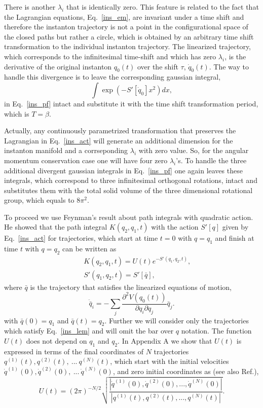 \documentclass[journal=jpcafh,manuscript=article]{achemso}
\begin{document}
There is another $\lambda_i$ that is identically zero. This feature is
related to the fact that the Lagrangian equations, Eq.~\ref{ins_em},
are invariant under a time shift and therefore the instanton
trajectory is not a point in the configurational space of the closed
paths but rather a circle, which is obtained by an arbitrary time
shift transformation to the individual instanton trajectory. The
linearized trajectory, which corresponds to the infinitesimal
time-shift and which has zero $\lambda_i$, is the derivative of the
original instanton $q_0(t)$ over the shift $\tau$, $\dot{q}_0(t)$. The
way to handle this divergence is to leave the corresponding gaussian
integral,
\begin{equation}
  \label{zero_int}
\int\exp(-S'[\dot{q}_0]x^2)dx,
\end{equation}
in Eq.~\ref{ins_pf} intact and substitute it with the time shift
transformation period, which is $T=\beta$.

Actually, any continuously parametrized transformation that preserves
the Lagrangian in Eq.~\ref{ins_act} will generate an additional
dimension for the instanton manifold and a corrseponding $\lambda_i$
with zero value. So, for the angular momentum conservation case one
will have four zero $\lambda_i$'s.  To handle the three additional
divergent gaussian integrals in Eq.~\ref{ins_pf} one again leaves
these integrals, which correspond to three infinitesimal orthogonal
rotations, intact and substitutes them with the total solid volume of
the three dimensional rotational group, which equals to $8\pi^2$.

To proceed we use Feynman's result about path integrals with
quadratic action\cite{feynman72}. He showed that the path integral
$K(q_2,q_1,t)$
with the action $S'[q]$ given by  Eq.~\ref{ins_act} for trajectories,
which start at time
$t=0$ with $q=q_1$ and finish at time $t$ with $q=q_2$ can be written as 
\begin{eqnarray}
  \label{qpi}
  &&K(q_2,q_1,t)= U(t)e^{-S'(q_1,q_2,t)},
  \\
  \nonumber
  &&S'(q_1,q_2,t) =S'[\bar{q}], 
\end{eqnarray}
where $\bar{q}$ is the trajectory that satisfies the linearized
equations of motion,
\begin{equation}
  \label{ins_lem}
  \ddot{\bar{q}}_i = -\sum_j\frac{\partial^2V(q_0(t))}{\partial q_i\partial q_j}\bar{q}_j.
\end{equation}
with $\bar{q}(0)=q_1$ and $\bar{q}(t)=q_2$. Further we will consider
only the trajectories which satisfy Eq.~\ref{ins_lem} and will omit
the bar over $q$ notation. The function $U(t)$ does not depend on
$q_1$ and $q_2$. In Appendix A we show that $U(t)$ is expressed in
terms of the final coordinates of $N$ trajectories
$q^{(1)}(t), q^{(2)}(t),\ ...\ q^{(N)}(t)$, which start with the
initial velocities
$\dot{q}^{(1)}(0), \dot{q}^{(2)}(0),\ ...\ \dot{q}^{(N)}(0)$, and zero
initial coordinates as (see also Ref.\cite{althorpe11}),
\begin{equation}
  \label{pref}
  U(t) =(2\pi)^{-N/2}\sqrt{\frac{|\dot{q}^{(1)}(0),\dot{q}^{(2)}(0),...,\dot{q}^{(N)}(0)|}{|q^{(1)}(t),q^{(2)}(t),...,q^{(N)}(t)|}}.
\end{equation}
\end{document}
